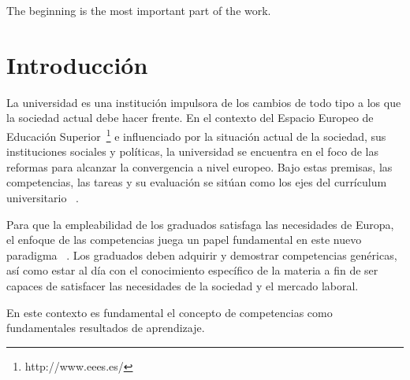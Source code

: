 



\begin{savequote}[50mm]
The beginning is the most important part of the work. 
\end{savequote}

\chapter{Introducción}
\label{cha:Introduction}

\ifpdf
    \graphicspath{{1_introduction/figures/PNG/}{1_introduction/figures/PDF/}{1_introduction/figures/}}
\else
    \graphicspath{{1_introduction/figures/EPS/}{1_introduction/figures/}}
\fi



La universidad es una institución impulsora de los cambios de todo tipo a los que la sociedad actual debe hacer frente. En el contexto del Espacio Europeo de Educación Superior~\footnote{http://www.eees.es/} e influenciado por la situación  actual de  la sociedad, sus instituciones sociales y políticas, la universidad se encuentra en el foco de las reformas para alcanzar la convergencia a nivel europeo. Bajo estas premisas, las competencias, las tareas y su evaluación se sitúan como los ejes del currículum universitario ~\cite{zabala2005espacio}.

Para que la empleabilidad de los graduados satisfaga las necesidades de Europa, el enfoque de las competencias juega un papel fundamental en este nuevo paradigma  ~\cite{communique2012making}. Los graduados deben adquirir y demostrar competencias genéricas, así como estar al día con el conocimiento específico de la materia a fin de ser capaces de satisfacer las necesidades de la sociedad y el mercado laboral.

En este contexto es fundamental el concepto de competencias como fundamentales resultados de aprendizaje.



